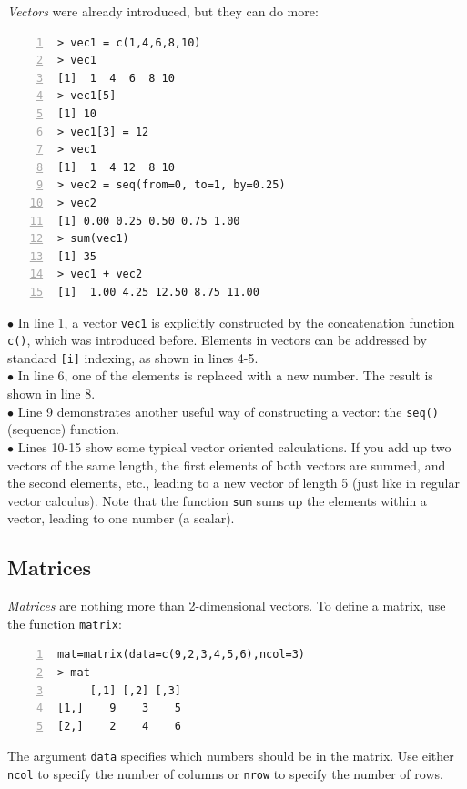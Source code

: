\documentclass[a4paper,11pt,twocolumn,tablecaptionabove]{scrartcl}
\begin{document}
\emph{Vectors} were already introduced, but they can do more:

\begin{Verbatim}[frame=single,numbers=left,gobble=0, xleftmargin=0.35cm, numbersep=0.1cm]
> vec1 = c(1,4,6,8,10)
> vec1
[1]  1  4  6  8 10
> vec1[5]
[1] 10
> vec1[3] = 12
> vec1
[1]  1  4 12  8 10
> vec2 = seq(from=0, to=1, by=0.25)
> vec2
[1] 0.00 0.25 0.50 0.75 1.00
> sum(vec1)
[1] 35
> vec1 + vec2
[1]  1.00 4.25 12.50 8.75 11.00
\end{Verbatim}

\noindent $\bullet$  In line 1, a vector \texttt{vec1} is explicitly constructed by the concatenation function \texttt{c()}, which was introduced before. Elements in vectors can be addressed by standard \texttt{[i]} indexing, as shown in lines 4-5. \\
\noindent $\bullet$  In line 6, one of the elements is replaced with a new number. The result is shown in line 8.\\
\noindent $\bullet$ Line 9 demonstrates another useful way of constructing a vector: the \texttt{seq()} (sequence) function. \\
\noindent $\bullet$ Lines 10-15 show some typical vector oriented calculations. If you add up two vectors of the same length, the first elements of both vectors are summed, and the second elements, etc., leading to a new vector of length 5 (just like in regular vector calculus). Note that the function \texttt{sum} sums up the elements within a vector, leading to one number (a scalar).

\subsection{Matrices}

\emph{Matrices} are nothing more than 2-dimensional vectors. To define a matrix, use the function \texttt{matrix}:
\begin{Verbatim}[frame=single,numbers=left,gobble=0, xleftmargin=0.35cm, numbersep=0.1cm]
mat=matrix(data=c(9,2,3,4,5,6),ncol=3)
> mat
     [,1] [,2] [,3]
[1,]    9    3    5
[2,]    2    4    6
\end{Verbatim}

The argument \texttt{data} specifies which numbers should be in the matrix. Use either  \texttt{ncol} to specify the number of columns or \texttt{nrow} to specify the number of rows. 
\end{document}
